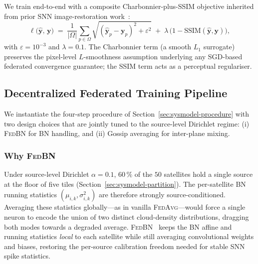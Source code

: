 \documentclass[conference]{IEEEtran}
\begin{document}
We train end-to-end with a composite Charbonnier-plus-SSIM
objective inherited from prior SNN image-restoration
work~\cite{ref:esdnet}:
\begin{equation}
\ell\big(\hat{\mathbf{y}},\,\mathbf{y}\big) \;=\;
\frac{1}{|\Omega|}\!\sum_{p\in\Omega}\!
\sqrt{(\hat{\mathbf{y}}_p\!-\!\mathbf{y}_p)^2 + \varepsilon^2}
\;+\;\lambda\,\big(1 - \mathrm{SSIM}(\hat{\mathbf{y}},\mathbf{y})\big),
\label{eq:loss}
\end{equation}
with $\varepsilon\!=\!10^{-3}$ and $\lambda\!=\!0.1$. The
Charbonnier term (a smooth $L_1$ surrogate) preserves the
pixel-level $L$-smoothness assumption underlying any SGD-based
federated convergence guarantee; the SSIM term acts as a
perceptual regulariser.


\subsection{Decentralized Federated Training Pipeline}\label{sec:framework-fl}

We instantiate the four-step procedure of
Section~\ref{sec:sysmodel-procedure} with two design choices that
are jointly tuned to the source-level Dirichlet regime: (i)
\textsc{FedBN} for BN handling, and (ii) Gossip averaging for
inter-plane mixing.

\subsubsection*{Why \textsc{FedBN}}
Under source-level Dirichlet $\alpha\!=\!0.1$, $60\,\%$ of the
$50$ satellites hold a single source at the floor of five tiles
(Section~\ref{sec:sysmodel-partition}). The per-satellite BN running statistics
$(\mu_{i,k},\sigma^2_{i,k})$ are therefore strongly source-conditioned.
Averaging these statistics globally---as in vanilla
\textsc{FedAvg}---would force a single neuron to encode the
union of two distinct cloud-density distributions, dragging both
modes towards a degraded average. \textsc{FedBN}~\cite{ref:fedbn}
keeps the BN affine and running statistics \emph{local} to each
satellite while still averaging convolutional weights and biases,
restoring the per-source calibration freedom needed for stable
SNN spike statistics.
\end{document}
